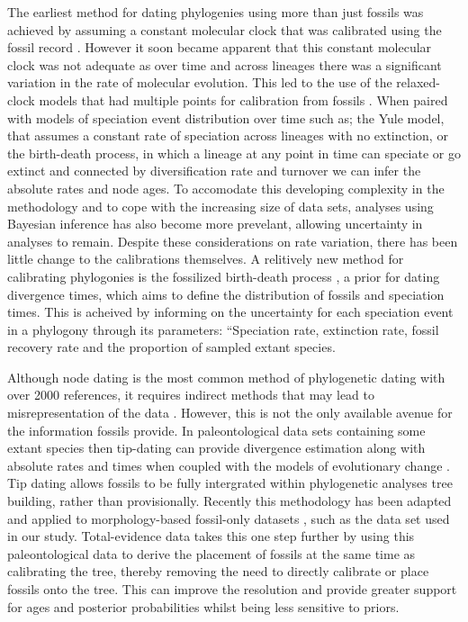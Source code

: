 \documentclass[11pt,letterpaper]{article}
\begin{document}
The earliest method for dating phylogenies using more than just fossils was achieved by assuming a constant molecular clock that was calibrated using the fossil record \citep{zuckerkandl1962molecular}. However it soon became apparent that this constant molecular clock was not adequate as over time and across lineages there was a significant variation in the rate of molecular evolution. This led to the use of the relaxed-clock models that had multiple points for calibration from fossils \citep{drummond2006relaxed}. When paired with models of speciation event distribution over time such as; the Yule model, that assumes a constant rate of speciation across lineages with no extinction, \citep{yule1925mathematical} or the birth-death process, in which a lineage at any point in time can speciate or go extinct and connected by diversification rate and turnover \citep{kendall1948generalized} we can infer the absolute rates and node ages. To accomodate this developing complexity in the methodology and to cope with the increasing size of data sets, analyses using Bayesian inference has also become more prevelant, allowing uncertainty in analyses to remain. Despite these considerations on rate variation, there has been little change to the calibrations themselves. A relitively new method for calibrating phylogonies is the fossilized birth-death process \citep{heath2014fossilized}, a prior for dating divergence times, which aims to define the distribution of fossils and speciation times. This is acheived by informing on the uncertainty for each speciation event in a phylogony through its parameters: ``Speciation rate, extinction rate, fossil recovery rate and the proportion of sampled extant species.  

Although node dating is the most common method of phylogenetic dating with over 2000 references, it requires indirect methods that may lead to misrepresentation of the data \citep{turner2017empirical}. However, this is not the only available avenue for the information fossils provide. In paleontological data sets containing some extant species then tip-dating can provide divergence estimation along with absolute rates and times when coupled with the models of evolutionary change \citep{pyron2011divergence}. Tip dating allows fossils to be fully intergrated within phylogenetic analyses tree building, rather than provisionally. Recently this methodology has been adapted and applied to morphology-based fossil-only datasets \citep{slater2015iterative}, such as the data set used in our study. Total-evidence data takes this one step further by using this paleontological data to derive the placement of fossils at the same time as calibrating the tree, thereby removing the need to directly calibrate or place fossils onto the tree. This can improve the resolution and provide greater support for ages and posterior probabilities whilst being less sensitive to priors.  
\end{document}
